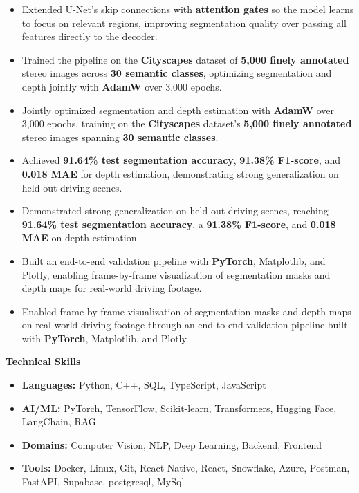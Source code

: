 \documentclass[10pt]{extarticle}
\newcommand{\sectionheader}[1]{
    \vspace{3pt}
    \begin{tcolorbox}
        \textbf{\large #1}
    \end{tcolorbox}
    \vspace{2pt}
}
\begin{document}
\begin{itemize}[itemsep=7pt]
\begin{itemize}
        \item Extended U-Net's skip connections with \textbf{attention gates} so the model learns to focus on relevant regions, improving segmentation quality over passing all features directly to the decoder.
        \item Trained the pipeline on the \textbf{Cityscapes} dataset of \textbf{5,000 finely annotated} stereo images across \textbf{30 semantic classes}, optimizing segmentation and depth jointly with \textbf{AdamW} over 3,000 epochs.
        \item Jointly optimized segmentation and depth estimation with \textbf{AdamW} over 3,000 epochs, training on the \textbf{Cityscapes} dataset's \textbf{5,000 finely annotated} stereo images spanning \textbf{30 semantic classes}.
        \item Achieved \textbf{91.64\% test segmentation accuracy}, \textbf{91.38\% F1-score}, and \textbf{0.018 MAE} for depth estimation, demonstrating strong generalization on held-out driving scenes.
        \item Demonstrated strong generalization on held-out driving scenes, reaching \textbf{91.64\% test segmentation accuracy}, a \textbf{91.38\% F1-score}, and \textbf{0.018 MAE} on depth estimation.
        \item Built an end-to-end validation pipeline with \textbf{PyTorch}, Matplotlib, and Plotly, enabling frame-by-frame visualization of segmentation masks and depth maps for real-world driving footage.
        \item Enabled frame-by-frame visualization of segmentation masks and depth maps on real-world driving footage through an end-to-end validation pipeline built with \textbf{PyTorch}, Matplotlib, and Plotly.
    \end{itemize}
\end{itemize}

\sectionheader{Technical Skills}
\begin{itemize}
    \item \textbf{Languages:} Python, C++, SQL, TypeScript, JavaScript
    \item \textbf{AI/ML:} PyTorch, TensorFlow, Scikit-learn, Transformers, Hugging Face, LangChain, RAG
    \item \textbf{Domains:} Computer Vision, NLP, Deep Learning, Backend, Frontend
    \item \textbf{Tools:} Docker, Linux, Git, React Native, React, Snowflake, Azure, Postman, FastAPI, Supabase, postgresql, MySql
\end{itemize}
\end{document}
